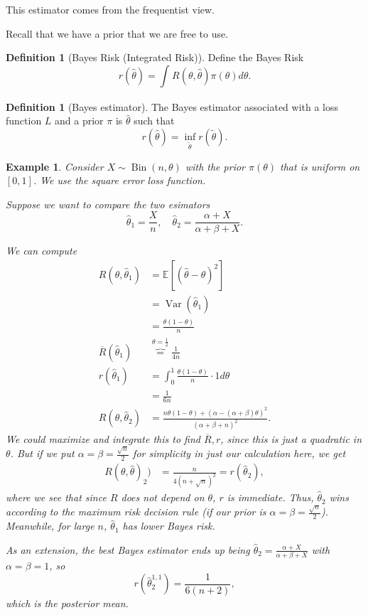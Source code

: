 \documentclass{tufte-handout}
\newcommand*\E{\mathbb{E}}
\newtheorem{ex}[thm]{Example}
\theoremstyle{definition}
\newtheorem{defn}[thm]{Definition}
\begin{document}
This estimator comes from the frequentist view.

Recall that we have a prior that we are free to use.

\begin{defn}[Bayes Risk (Integrated Risk)]
	Define the Bayes Risk \[
		r(\hat{\theta}) = \int_{}^{} R(\theta, \hat{\theta}) \pi(\theta) d\theta 
	.\] 
\end{defn}
\begin{defn}[Bayes estimator]
	The Bayes estimator associated with a loss function $L$ and a prior $\pi$ is $\hat{\theta}$ such that \[
		r(\hat{\theta}) = \inf_{\tilde{\theta}}r(\tilde{\theta})
	.\] 
\end{defn}

\begin{ex}
	Consider $X\sim \operatorname{Bin}(n, \theta)$ with the prior $\pi(\theta)$ that is uniform on $[0,1]$. We use the square error loss function.

	Suppose we want to compare the two esimators \[
		\hat{\theta}_1 = \frac{X}{n}, \quad \hat{\theta}_2 = \frac{\alpha+X}{\alpha+\beta+X}
	.\] 
	
	We can compute
	\begin{align*}
		R(\theta, \hat{\theta}_1) &= \E\left[\left( \hat{\theta}-\theta \right)^2\right]  \\
								 &= \operatorname{Var}\left(\hat{\theta}_1\right) \\
								 &= \frac{\theta(1-\theta)}{n} \\
		\overline{R}(\hat{\theta}_1) &\overbrace{=}^{\theta = \frac{1}{2}} \frac{1}{4n} \\
								 r(\hat{\theta}_1) &= \int_{0}^{1} \frac{\theta(1-\theta)}{n} \cdot  1 d\theta  \\
												   &= \frac{1}{6n} \\
								 R(\theta, \hat{\theta}_2) &= \frac{n \theta(1-\theta) + \left( \alpha - \left( \alpha + \beta \right)\theta \right)^2}{\left( \alpha+\beta+n \right)^2}
	.\end{align*}
	We could maximize and integrate this to find $\overline{R}, r$, since this is just a quadratic in $\theta$. But if we put $\alpha = \beta = \frac{\sqrt{n} }{2}$ for simplicity in just our calculation here, we get 
	\begin{align*}
		R(\theta, \hat{\theta})_2) &= \frac{n}{4 \left( n + \sqrt{n}  \right)^2}  = r(\hat{\theta}_2)
	,\end{align*}
	where we see that since $R$ does not depend on $\theta$, $r$ is immediate.
	Thus, $\hat{\theta}_2$ wins according to the maximum risk decision rule (if our prior is $\alpha = \beta = \frac{\sqrt{n} }{2} $). Meanwhile, for large $n$, $\hat{\theta}_1$ has lower Bayes risk.

	As an extension, the best Bayes estimator ends up being $\hat{\theta}_2 = \frac{\alpha + X}{\alpha + \beta + X}$ with $\alpha = \beta =1$, so \[
		r(\hat{\theta}_2^{1,1}) = \frac{1}{6(n+2)}
	,\] 
	which is the posterior mean.
\end{ex}
\end{document}
